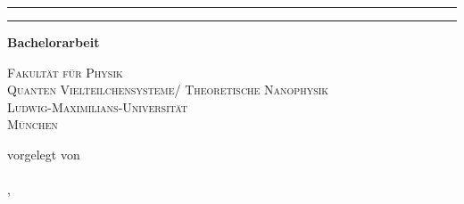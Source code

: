 \begin{titlepage}   

    {\parindent0cm
    \rule{\linewidth}{.4ex}}
  \begin{center}
    {\sffamily \bfseries \Huge \getTitleDE}
  \end{center}
    \rule{\linewidth}{.4ex}


  \begin{center}
    {\rmfamily \bfseries \Large Bachelorarbeit}


    {\scshape \large
     Fakultät für Physik \\
     Quanten Vielteilchensysteme/ Theoretische Nanophysik\\
     Ludwig-Maximilians-Universität\\
     München
     
     
     vorgelegt von \\
    
     {\rmfamily \bfseries \Large \getAuthor} \\

     
     \getPrintLocationDE, \getSubmissionDateDE
     }
  \end{center}
  
\end{titlepage}
